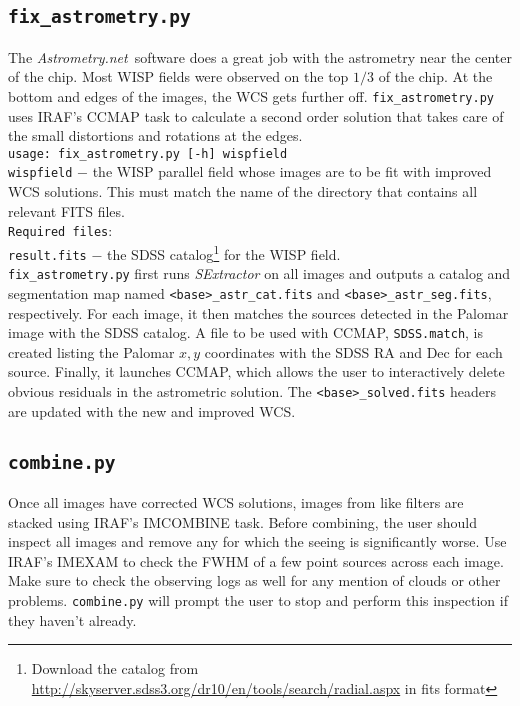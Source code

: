 \documentclass{article}
\newcommand{\An}{\textit{Astrometry.net}}
\begin{document}
\subsection{\texttt{fix\_astrometry.py}}
The \An~software does a great job with the astrometry near the 
center of the chip. Most WISP fields
were observed on the top $1/3$ of the chip. At the bottom and edges of 
the images, the WCS gets further off. 
\texttt{fix\_astrometry.py} uses IRAF's CCMAP task to calculate
a second order solution that takes care of the small 
distortions and rotations at the
edges. \\

\texttt{usage: fix\_astrometry.py [-h] wispfield} \\

\texttt{wispfield} $-$ \hangindent=2.7cm the WISP parallel field whose images
are to be fit with improved WCS solutions. This must match the name of 
the directory that contains all relevant FITS files.\\

\texttt{Required files}: \\
\indent \indent \texttt{result.fits} $-$ the SDSS
catalog\footnote{Download the catalog from 
\url{http://skyserver.sdss3.org/dr10/en/tools/search/radial.aspx} in fits
format} for the WISP field. \\

\noindent \texttt{fix\_astrometry.py} first runs \textit{SExtractor}
on all images and outputs a catalog and segmentation map named
\texttt{<base>\_astr\_cat.fits} and \texttt{<base>\_astr\_seg.fits},
respectively. For each image, it then matches the sources detected in the
Palomar image with the SDSS catalog. A file to be used with CCMAP, 
\texttt{SDSS.match}, is created
listing the Palomar $x,y$ coordinates with the SDSS RA and Dec for each 
source. Finally, it launches CCMAP, which allows the user to interactively
delete obvious residuals in the astrometric solution. The 
\texttt{<base>\_solved.fits} headers are updated with the new and 
improved WCS. 

\subsection{\texttt{combine.py}}
Once all images have corrected WCS solutions, images from like filters
are stacked using IRAF's IMCOMBINE task. Before combining, the user should
inspect all images and remove any for which the seeing is significantly worse.
Use IRAF's IMEXAM to check the FWHM of a few point sources across each image.
Make sure to check the observing logs as well for any mention of clouds or 
other problems. \texttt{combine.py} will prompt the user to stop and 
perform this inspection if they haven't already. \\
\end{document}
